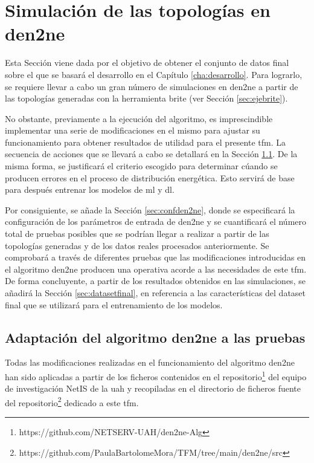 \section{Simulación de las topologías en \acrshort{den2ne}}

Esta Sección viene dada por el objetivo de obtener el conjunto de datos final sobre el que se basará el desarrollo en el Capítulo \ref{cha:desarrollo}. Para lograrlo, se requiere llevar a cabo un gran número de  simulaciones en \gls{den2ne} a partir de las topologías generadas con la herramienta \gls{brite} (ver Sección \ref{sec:ejebrite}). 

\vspace{3mm}

No obstante, previamente a la ejecución del algoritmo, es imprescindible implementar una serie de modificaciones en el mismo para ajustar su funcionamiento para obtener resultados de utilidad para el presente \gls{tfm}. La secuencia de acciones que se llevará a cabo se detallará en la Sección \ref{sec:cambiosden2ne}. De la misma forma, se justificará el criterio escogido para determinar cúando se producen errores en el proceso de distribución energética. Esto servirá de base para después entrenar los modelos de \gls{ml} y \gls{dl}.

\vspace{3mm}

Por consiguiente, se añade la Sección \ref{sec:confden2ne}, donde se especificará la configuración de los parámetros de entrada de \gls{den2ne} y se cuantificará el número total de pruebas posibles que se podrían llegar a realizar a partir de las topologías generadas y de los datos reales procesados anteriormente. Se comprobará a través de diferentes pruebas que las modificaciones introducidas en el algoritmo \gls{den2ne} producen una operativa acorde a las necesidades de este \gls{tfm}. De forma concluyente, a partir de los resultados obtenidos en las simulaciones, se añadirá la Sección \ref{sec:datasetfinal}, en referencia a las características del dataset final que se utilizará para el entrenamiento de los modelos.

\subsection{Adaptación del algoritmo \acrshort{den2ne} a las pruebas}
\label{sec:cambiosden2ne}

Todas las modificaciones realizadas en el funcionamiento del algoritmo \acrshort{den2ne} han sido aplicadas a partir de los ficheros contenidos en el repositorio\footnote{https://github.com/NETSERV-UAH/den2ne-Alg} del equipo de investigación NetIS de la \gls{uah} y recopiladas en el directorio de ficheros fuente del repositorio\footnote{https://github.com/PaulaBartolomeMora/TFM/tree/main/den2ne/src} dedicado a este \gls{tfm}.

